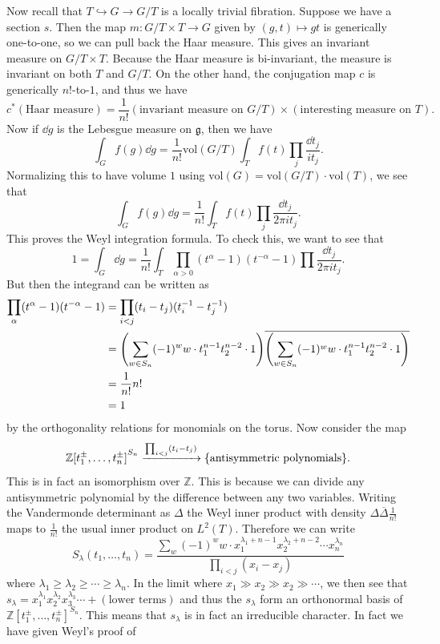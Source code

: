 \documentclass[leqno, openany]{memoir}
\theoremstyle{definition}
\theoremstyle{remark}
\theoremstyle{plain}
\theoremstyle{definition}
\theoremstyle{remark}
\newcommand{\Z}{\mathbb{Z}}
\newcommand{\mf}[1]{\mathfrak{#1}}
\newcommand{\mr}[1]{\mathrm{#1}}
\newcommand{\ol}[1]{\overline{#1}}
\begin{document}
Now recall that $T \hookrightarrow G \to G/T$ is a locally trivial fibration. Suppose we have a section $s$. Then the map $m \colon G / T \times T \to G$ given by $(g,t) \mapsto gt$ is generically one-to-one, so we can pull back the Haar measure. This gives an invariant measure on $G/T \times T$. Because the Haar measure is bi-invariant, the measure is invariant on both $T$ and $G/T$. On the other hand, the conjugation map $c$ is generically $n!$-to-$1$, and thus we have
\[ c^*(\text{Haar measure}) = \frac{1}{n!} (\text{invariant measure on $G/T$}) \times (\text{interesting measure on $T$}). \]
Now if $\dd{g}$ is the Lebesgue measure on $\mf{g}$, then we have
\[ \int_G f(g) \dd{g} = \frac{1}{n!} \mr{vol}(G/T) \int_T f(t) \prod_j \frac{\dd{t_j}}{i t_j}. \]
Normalizing this to have volume $1$ using $\mr{vol}(G) = \mr{vol}(G/T) \cdot \mr{vol}(T)$, we see that
\[ \int_G f(g) \dd{g} = \frac{1}{n!} \int_T f(t) \prod_j \frac{\dd{t_j}}{2 \pi i t_j}. \]
This proves the Weyl integration formula. To check this, we want to see that
\[ 1 = \int_G \dd{g} = \frac{1}{n!} \int_T \prod_{\alpha > 0} (t^{\alpha}-1)(t^{-\alpha}-1) \prod \frac{\dd{t_j}}{2 \pi i t_j}. \]
But then the integrand can be written as
\begin{align*}
    \prod_{\alpha} (t^{\alpha} - 1)(t^{-\alpha}-1) &= \prod_{i<j} (t_i - t_j)(t_i^{-1} - t_j^{-1}) \\
                                                   &= \qty( \sum_{w \in S_n} (-1)^w w \cdot t_1^{n-1} t_2^{n-2} \cdot 1 )\ol{\qty( \sum_{w \in S_n} (-1)^w w \cdot t_1^{n-1} t_2^{n-2} \cdot 1 )} \\
                                                   &= \frac{1}{n!} n! \\
                                                   &= 1
\end{align*}
by the orthogonality relations for monomials on the torus. Now consider the map
\[ {\Z[t_1^{\pm}, \ldots, t_n^{\pm}]}^{S_n} \xrightarrow{\prod_{i<j}(t_i - t_j)} \qty{\text{antisymmetric polynomials}}. \]
This is in fact an isomorphism over $\Z$. This is because we can divide any antisymmetric polynomial by the difference between any two variables. Writing the Vandermonde determinant as $\Delta$ the Weyl inner product with density $\Delta \ol{\Delta} \frac{1}{n!}$ maps to $\frac{1}{n!}$ the usual inner product on $L^2(T)$. Therefore we can write
\[ S_{\lambda}(t_1, \ldots, t_n) = \frac{\sum_w (-1)^w w \cdot x_1^{\lambda_1 +n-1} x_2^{\lambda_2 + n-2} \cdots x_n^{\lambda_n}}{\prod_{i<j} (x_i - x_j)} \]
where $\lambda_1 \geq \lambda_2 \geq \cdots \geq \lambda_n$. In the limit where $x_1 \gg x_2 \gg x_2 \gg \cdots$, we then see that $s_{\lambda} = x_1^{\lambda_1} x_2^{\lambda_2} x_3^{\lambda_3} \cdots + (\text{lower terms})$ and thus the $s_{\lambda}$ form an orthonormal basis of ${\Z[t_1^{\pm}, \ldots, t_n^{\pm}]}^{S_n}$. This means that $s_{\lambda}$ is in fact an irreducible character. In fact we have given Weyl's proof of
\end{document}
